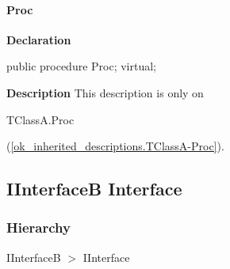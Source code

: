 \documentclass{report}
\newif\ifpdf
\begin{document}
\paragraph*{Proc}\hspace*{\fill}

\label{ok_inherited_descriptions.TClassA-Proc}
\begin{list}{}{
\setlength{\itemindent}{0cm}
\setlength{\listparindent}{0cm}
\setlength{\leftmargin}{\evensidemargin}
\addtolength{\leftmargin}{\tmplength}
\settowidth{\labelsep}{X}
\addtolength{\leftmargin}{\labelsep}
\setlength{\labelwidth}{\tmplength}
}
\item[\textbf{Declaration}\hfill]
\ifpdf
\begin{flushleft}
\fi
\begin{ttfamily}
public procedure Proc; virtual;\end{ttfamily}

\ifpdf
\end{flushleft}
\fi

\par
\item[\textbf{Description}]
This description is only on \begin{ttfamily}TClassA.Proc\end{ttfamily}(\ref{ok_inherited_descriptions.TClassA-Proc}).

\end{list}
\ifpdf
\subsection*{\large{\textbf{IInterfaceB Interface}}\normalsize\hspace{1ex}\hrulefill}
\else
\subsection*{IInterfaceB Interface}
\fi
\label{ok_inherited_descriptions.IInterfaceB}
\subsubsection*{\large{\textbf{Hierarchy}}\normalsize\hspace{1ex}\hfill}
IInterfaceB {$>$} IInterface
\end{document}
